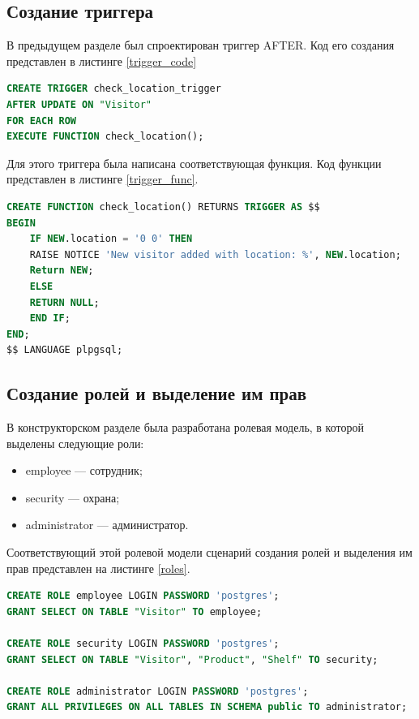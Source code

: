 \subsection{Создание триггера}

В предыдущем разделе был спроектирован триггер AFTER.
Код его создания представлен в листинге \ref{trigger_code}

\captionsetup{singlelinecheck = false, justification=raggedright}
\begin{lstlisting}[language=sql, caption=Реализация триггера AFTER, label=trigger_code]
CREATE TRIGGER check_location_trigger
AFTER UPDATE ON "Visitor"
FOR EACH ROW
EXECUTE FUNCTION check_location();
\end{lstlisting}
\captionsetup{singlelinecheck = false, justification=centering}

Для этого триггера была написана соответствующая функция.
Код функции представлен в листинге \ref{trigger_func}.

\captionsetup{singlelinecheck = false, justification=raggedright}
\begin{lstlisting}[language=sql, caption=Реализация функции, label=trigger_func]
CREATE FUNCTION check_location() RETURNS TRIGGER AS $$
BEGIN
    IF NEW.location = '0 0' THEN
    RAISE NOTICE 'New visitor added with location: %', NEW.location;
    Return NEW;
    ELSE
    RETURN NULL;
    END IF;
END;
$$ LANGUAGE plpgsql;
\end{lstlisting}
\captionsetup{singlelinecheck = false, justification=centering}

\subsection{Создание ролей и выделение им прав}

В конструкторском разделе была разработана ролевая модель, в которой выделены
следующие роли:
\begin{itemize}
    \item employee --- сотрудник;
    \item security --- охрана;
    \item administrator --- администратор.
\end{itemize}

Соответствующий этой ролевой модели сценарий создания ролей и выделения им прав
представлен на листинге \ref{roles}.

\begin{lstlisting}[language=sql, caption=Создание ролей и выделение им прав, label=roles]
CREATE ROLE employee LOGIN PASSWORD 'postgres';
GRANT SELECT ON TABLE "Visitor" TO employee;

CREATE ROLE security LOGIN PASSWORD 'postgres';
GRANT SELECT ON TABLE "Visitor", "Product", "Shelf" TO security;

CREATE ROLE administrator LOGIN PASSWORD 'postgres';
GRANT ALL PRIVILEGES ON ALL TABLES IN SCHEMA public TO administrator;

\end{lstlisting}
\captionsetup{singlelinecheck = false, justification=centering}

